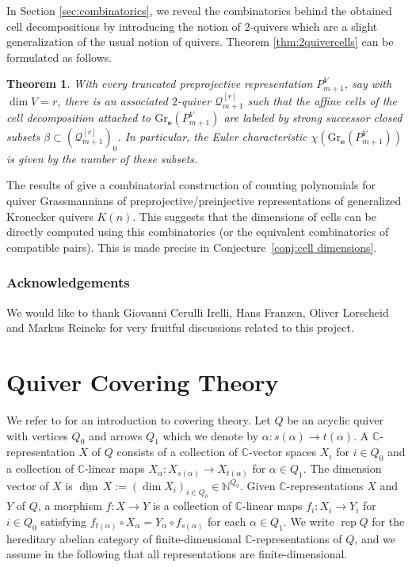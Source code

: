 \documentclass[smallextended,envcountsect,envcountsame]{svjour3}
\newtheorem{thm}{Theorem}
\numberwithin{equation}{section}
\newcommand{\C}{\mathbb{C}}
\newcommand{\CC}{\mathbb{C}}
\newcommand{\NN}{\mathbb{N}}
\newcommand{\bfe}{\mathbf{e}}
\newcommand\udim{{\underline{\dim}\, }}
\newcommand{\Gr}{\mathrm{Gr}}
\newcommand{\rep}{\operatorname{rep}}
\begin{document}
In Section \ref{sec:combinatorics}, we reveal the combinatorics behind the obtained cell decompositions by introducing the notion of $2$-quivers which are a slight generalization of the usual notion of quivers.
Theorem \ref{thm:2quivercells} can be formulated as follows.
\begin{thm}
  With every truncated preprojective representation $P_{m+1}^V$, say with $\dim V=r$, there is an associated $2$-quiver $\mathcal Q_{m+1}^{[r]}$ such that the affine cells of the cell decomposition attached to $\Gr_\bfe(P_{m+1}^V)$ are labeled by strong successor closed subsets $\beta\subset (\mathcal Q_{m+1}^{[r]})_0$.
  In particular, the Euler characteristic $\chi(\Gr_\bfe(P_{m+1}^V))$ is given by the number of these subsets.
\end{thm}

The results of \cite{rupel} give a combinatorial construction of counting polynomials for quiver Grassmannians of preprojective/preinjective representations of generalized Kronecker quivers $K(n)$.
This suggests that the dimensions of cells can be directly computed using this combinatorics (or the equivalent combinatorics of compatible pairs).
This is made precise in Conjecture~\ref{conj:cell dimensions}.

\subsubsection*{Acknowledgements}
We would like to thank Giovanni Cerulli Irelli, Hans Franzen, Oliver Lorscheid and Markus Reineke for very fruitful discussions related to this project.


\section{Quiver Covering Theory}
\label{sec:covering}
\noindent
We refer to \cite{gab} for an introduction to covering theory.
Let $Q$ be an acyclic quiver with vertices $Q_0$ and arrows $Q_1$ which we denote by $\alpha:s(\alpha)\to t(\alpha)$.
A $\CC$-representation $X$ of $Q$ consists of a collection of $\CC$-vector spaces $X_i$ for $i\in Q_0$ and a collection of $\CC$-linear maps $X_\alpha:X_{s(\alpha)}\to X_{t(\alpha)}$ for $\alpha\in Q_1$.
The dimension vector of $X$ is $\udim X:=(\dim X_i)_{i\in Q_0}\in\NN^{Q_0}$.
Given $\CC$-representations $X$ and $Y$ of $Q$, a morphism $f:X\to Y$ is a collection of $\CC$-linear maps $f_i:X_i\to Y_i$ for $i\in Q_0$ satisfying $f_{t(\alpha)}\circ X_\alpha=Y_\alpha\circ f_{s(\alpha)}$ for each $\alpha\in Q_1$.
We write $\rep Q$ for the hereditary abelian category of finite-dimensional $\C$-representations of $Q$, and we assume in the following that all representations are finite-dimensional.
\end{document}
